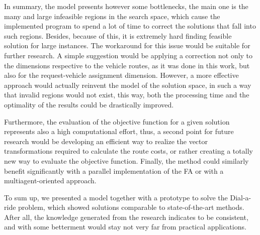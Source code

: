 \documentclass[tuberlin,cic,tc,openright,english,noabntcite,oneside]{iiufrgs}
\begin{document}
In summary, the model presents however some bottlenecks, the main one is the many and large infeasible regions in the search space, which cause the implemented program to spend a lot of time to correct the solutions that fall into such regions. Besides, because of this, it is extremely hard finding feasible solution for large instances. The workaround for this issue would be suitable for further research. A simple suggestion would be applying a correction not only to the dimensions respective to the vehicle routes, as it was done in this work, but also for the request-vehicle assignment dimension. However, a more effective approach would actually reinvent the model of the solution space, in such a way that invalid regions would not exist, this way, both the processing time and the optimality of the results could be drastically improved.

Furthermore, the evaluation of the objective function for a given solution represents also a high computational effort, thus, a second point for future research would be developing an efficient way to realize the vector transformations required to calculate the route costs, or rather creating a totally new way to evaluate the objective function. Finally, the method could similarly benefit significantly with a parallel implementation of the FA or with a multiagent-oriented approach.

To sum up, we presented a model together with a prototype to solve the Dial-a-ride problem, which showed solutions comparable to state-of-the-art methods. After all, the knowledge generated from the research indicates to be consistent, and with some betterment would stay not very far from practical applications.
\nocite{*}
%
\printbibliography
\end{document}
